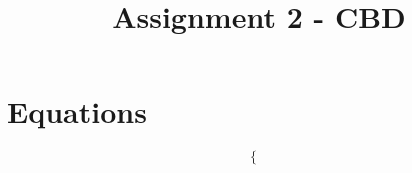 \documentclass[a4paper,12pt]{article}
\begin{document}
\title{Assignment 2 - CBD}\date{}\maketitle
\section{Equations}
\[
\left\{
\begin{array}{c}
\end{array}
\right.
\]
\end{document}
